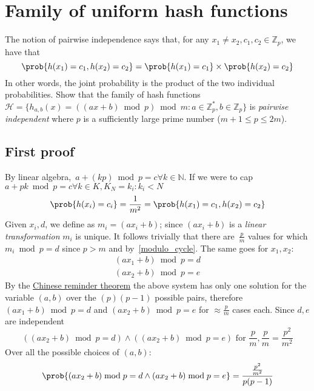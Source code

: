 \section{Family of uniform hash functions}

The notion of pairwise independence says that, for any $x_1 \neq x_2, c_1, c_2
\in \mathbb{Z}_p$, we have that
\begin{equation}
  \label{equation:pairwise-independence}
  \prob{h(x_1)= c_1, h(x_2) = c_2} = \prob{h(x_1) = c_1} \times \prob{h(x_2) = c_2}
\end{equation}
In other words, the joint probability is the product of the two individual probabilities.
Show that the family of hash functions $\mathcal{H} = \{h_{a,b}(x) = ((ax + b) \bmod p) \bmod m :
a \in \mathbb{Z}^*_p,
b \in \mathbb{Z}_p \}$ is \emph{pairwise independent}
where $p$ is a sufficiently large prime number ($m + 1 \leq p \leq 2m$).

\subsection{First proof}

By linear algebra,~\label{modulo_cycle}$a + (kp) \bmod p = c \forall k \in \mathbb{N}$.
If we were to cap $a + pk \bmod p = c \forall k \in K, K_{N} = {k_{i}: k_{i} < N}$
\begin{equation*}
  \prob{h(x_{i}) = c_{i}} = \frac{1}{m^{2}} = \prob{h(x_{1}) = c_{1}, h(x_{2}) = c_{2}}
\end{equation*}
Given $x_{i}, d$, we define as $m_{i} = (a x_{i} + b)$; since $(a x_{i} + b)$
is a \emph{linear transformation} $m_{i}$ is unique.
It follows trivially that there are~\label{p_over_m}$\frac{p}{m}$ values for which $m_{i} \bmod p = d$
since $p > m$ and by~\ref{modulo_cycle}.
The same goes for $x_{1}, x_{2}$:
\begin{gather*}
  (a x_{1} + b) \bmod p = d \\
  (a x_{2} + b) \bmod p = e
\end{gather*}
By the \href{http://en.wikipedia.org/wiki/Chinese_remainder_theorem}{Chinese
reminder theorem} the above system has only one solution for the variable $(a, b)$
over the $(p)(p - 1)$ possible pairs, therefore $(a x_{1} + b) \bmod p = d$ and
$(a x_{2} + b) \bmod p = e$
for $\approx \frac{p}{m}$ cases each.
Since $d, e$ are independent
\begin{equation*}
  ((a x_{2} + b) \bmod p = d) \wedge ((a x_{2} + b) \bmod p = e) \textrm{ for }
  \frac{p}{m}, \frac{p}{m} = \frac{p^{2}}{m^{2}}
\end{equation*}
Over all the possible choices of $(a, b)$:
\begin{equation*}
  \prob{(a x_{2} + b) \bmod p = d \wedge  (a x_{2} + b) \bmod p = e} = \frac{\frac{p^{2}}{m^{2}}}{p(p - 1)}
\end{equation*}

